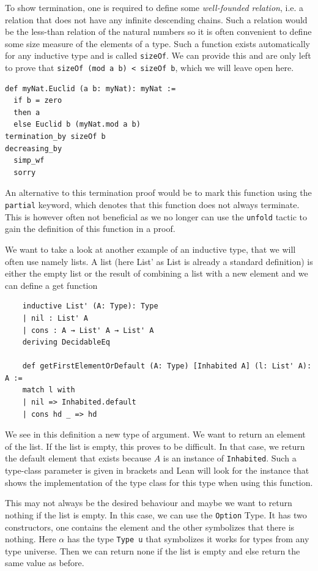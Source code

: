 To show termination, one is required to define some \textit{well-founded relation}, i.e. a relation that does not have any infinite descending chains. Such a relation would be the less-than relation of the natural numbers so it is often convenient to define some size measure of the elements of a type. Such a function exists automatically for any inductive type and is called \lstinline|sizeOf|. We can provide this and are only left to prove that \lstinline|sizeOf (mod a b) < sizeOf b|, which we will leave open here.

\begin{lstlisting}
def myNat.Euclid (a b: myNat): myNat :=
  if b = zero
  then a
  else Euclid b (myNat.mod a b)
termination_by sizeOf b
decreasing_by
  simp_wf
  sorry
\end{lstlisting}

An alternative to this termination proof would be to mark this function using the \lstinline|partial| keyword, which denotes that this function does not always terminate. This is however often not beneficial as we no longer can use the \lstinline|unfold| tactic to gain the definition of this function in a proof.



We want to take a look at another example of an inductive type, that we will often use namely lists. A list (here List' as List is already a standard definition) is either the empty list or the result of combining a list with a new element and we can define a get function

\begin{lstlisting}
    inductive List' (A: Type): Type
    | nil : List' A
    | cons : A → List' A → List' A
    deriving DecidableEq

    def getFirstElementOrDefault (A: Type) [Inhabited A] (l: List' A): A :=
    match l with
    | nil => Inhabited.default
    | cons hd _ => hd
\end{lstlisting}

We see in this definition a new type of argument. We want to return an element of the list. If the list is empty, this proves to be difficult. In that case, we return the default element that exists because $A$ is an instance of \lstinline|Inhabited|. Such a type-class parameter is given in brackets and Lean will look for the instance that shows the implementation of the type class for this type when using this function.

This may not always be the desired behaviour and maybe we want to return nothing if the list is empty. In this case, we can use the \lstinline|Option| Type. It has two constructors, one contains the element and the other symbolizes that there is nothing. Here $\alpha$ has the type \lstinline|Type u| that symbolizes it works for types from any type universe. Then we can return none if the list is empty and else return the same value as before.

